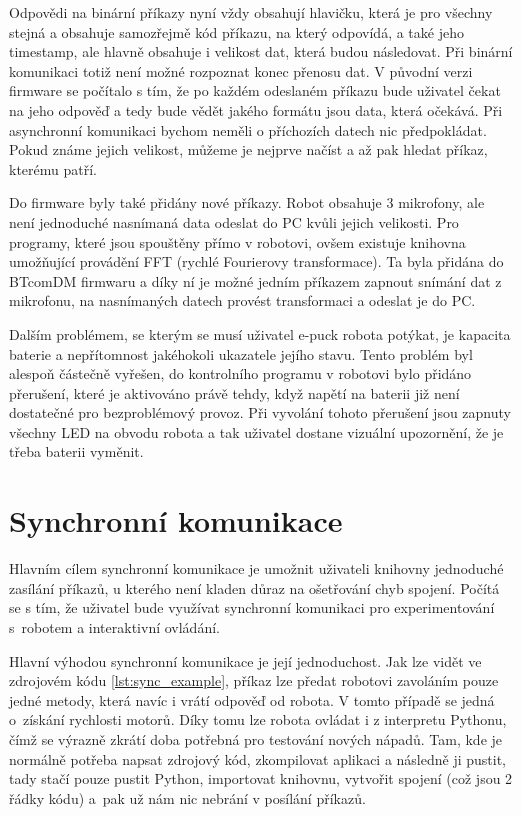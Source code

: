     Odpovědi na binární příkazy nyní vždy obsahují hlavičku, která je pro
    všechny stejná a obsahuje samozřejmě kód příkazu, na který odpovídá, a také
    jeho timestamp, ale hlavně obsahuje i velikost dat, která budou následovat.
    Při binární komunikaci totiž není možné rozpoznat konec přenosu dat. V
    původní verzi firmware se počítalo s tím, že po každém odeslaném příkazu
    bude uživatel čekat na jeho odpověď a tedy bude vědět jakého formátu jsou
    data, která očekává. Při asynchronní komunikaci bychom neměli o příchozích
    datech nic předpokládat. Pokud známe jejich velikost, můžeme je nejprve
    načíst a až pak hledat příkaz, kterému patří.

    Do firmware byly také přidány nové příkazy. Robot obsahuje 3 mikrofony, ale
    není jednoduché nasnímaná data odeslat do PC kvůli jejich velikosti. Pro
    programy, které jsou spouštěny přímo v robotovi, ovšem existuje knihovna
    umožňující provádění FFT (rychlé Fourierovy transformace). Ta byla přidána
    do BTcomDM firmwaru a díky ní je možné jedním příkazem zapnout snímání dat
    z mikrofonu, na nasnímaných datech provést transformaci a odeslat je do PC.

    Dalším problémem, se kterým se musí uživatel e-puck robota potýkat, je
    kapacita baterie a nepřítomnost jakéhokoli ukazatele jejího stavu. Tento
    problém byl alespoň částečně vyřešen, do kontrolního programu v robotovi
    bylo přidáno přerušení, které je aktivováno právě tehdy, když napětí na
    baterii již není dostatečné pro bezproblémový provoz. Při vyvolání tohoto
    přerušení jsou zapnuty všechny LED na obvodu robota a tak uživatel dostane
    vizuální upozornění, že je třeba baterii vyměnit.

    \section{Synchronní komunikace}
    \label{btcom:sync}

    Hlavním cílem synchronní komunikace je umožnit uživateli knihovny
    jednoduché zasílání příkazů, u kterého není kladen důraz na ošetřování chyb
    spojení. Počítá se s tím, že uživatel bude využívat synchronní komunikaci
    pro experimentování s~robotem a interaktivní ovládání.

    Hlavní výhodou synchronní komunikace je její jednoduchost. Jak lze vidět
    ve zdrojovém kódu \ref{lst:sync_example}, příkaz lze předat robotovi
    zavoláním pouze jedné metody, která navíc i vrátí odpověď od robota. V
    tomto případě se jedná o~získání rychlosti motorů. Díky tomu lze robota
    ovládat i z interpretu Pythonu, čímž se výrazně zkrátí doba potřebná pro
    testování nových nápadů. Tam, kde je normálně potřeba napsat zdrojový kód,
    zkompilovat aplikaci a následně ji pustit, tady stačí pouze pustit Python,
    importovat knihovnu, vytvořit spojení (což jsou 2 řádky kódu) a~pak už nám
    nic nebrání v posílání příkazů.


